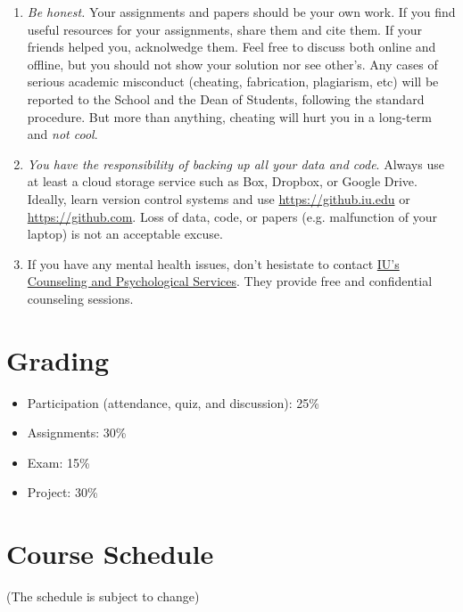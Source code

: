 \documentclass[11pt,article,oneside]{memoir} %
\begin{document}
\begin{enumerate}
\item \emph{Be honest.} Your assignments and papers should be your own work.
If you find useful resources for your assignments, share them and cite them. If
your friends helped you, acknolwedge them. Feel free to discuss both online and
offline, but you should not show your solution nor see other's. Any cases of
serious academic misconduct (cheating, fabrication, plagiarism, etc) will be
reported to the School and the Dean of Students, following the standard
procedure. But more than anything, cheating will hurt you in a long-term and
\emph{not cool}. 

\item \emph{You have the responsibility of backing up all your data and code}.
Always use at least a cloud storage service such as Box, Dropbox, or Google
Drive. Ideally, learn version control systems and use
\url{https://github.iu.edu} or \url{https://github.com}. Loss of data, code, or
papers (e.g. malfunction of your laptop) is not an acceptable excuse. 

\item If you have any mental health issues, don't hesistate to contact
\href{http://jhealthcenter.indiana.edu/counseling/index.shtml}{IU's Counseling
and Psychological Services}. They provide free and confidential counseling
sessions. 


\end{enumerate}
\section{Grading} %
\label{sec:grading_tentative_}

\begin{itemize}

\item Participation (attendance, quiz, and discussion): 25\%

\item Assignments: 30\%

\item Exam: 15\%

\item Project: 30\%

\end{itemize}
\section{Course Schedule} %

(The schedule is subject to change)
\end{document}
